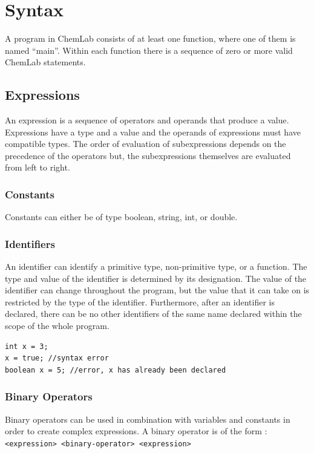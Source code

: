 \documentclass[11pt]{report}
\begin{document}
\section{Syntax}
A program in ChemLab consists of at least one function, where one of them is named ``main''. Within each function there is a sequence of zero or more valid ChemLab statements.

\subsection{Expressions}

An expression is a sequence of operators and operands that produce a value. Expressions have a type and a value and the operands of expressions must have compatible types. The order of evaluation of subexpressions depends on the precedence of the operators but, the subexpressions themselves are evaluated from left to right. 

\subsubsection{Constants}

Constants can either be of type boolean, string, int, or double. 

\subsubsection{Identifiers}

An identifier can identify a primitive type, non-primitive type, or a function. The type and value of the identifier is determined by its designation. The value of the identifier can change throughout the program, but the value that it can take on is restricted by the type of the identifier. Furthermore, after an identifier is declared, there can be no other identifiers of the same name declared within the scope of the whole program. 
\begin{verbatim}
int x = 3;
x = true; //syntax error
boolean x = 5; //error, x has already been declared 
\end{verbatim}

\subsubsection{Binary Operators}

Binary operators can be used in combination with variables and constants in order to create complex expressions. A binary operator is of the form : 
\texttt{<expression> <binary-operator> <expression>}
\end{document}
